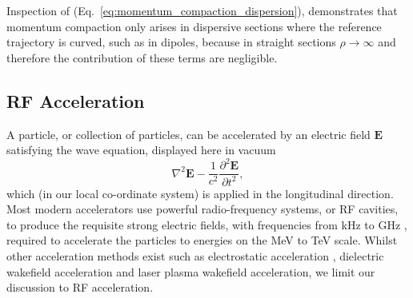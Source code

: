\documentclass[../main.tex]{subfiles}
\begin{document}
Inspection of (Eq.~\ref{eq:momentum_compaction_dispersion}), demonstrates that momentum compaction only arises in dispersive sections where the reference trajectory is curved, such as in dipoles, because in straight sections $\rho\rightarrow\infty$ and therefore the contribution of these terms are negligible. 

\subsection{RF Acceleration}

A particle, or collection of particles, can be accelerated by an electric field $\boldsymbol{E}$ satisfying the wave equation, displayed here in vacuum
\begin{equation}
\nabla^{2}\boldsymbol{E}-\frac{1}{c^{2}}\frac{\partial^{2}\boldsymbol{E}}{\partial t^{2}},
\label{eq:electromagnetic_wave_equation}    
\end{equation}
which (in our local co-ordinate system) is applied in the longitudinal direction. Most modern accelerators use powerful radio-frequency systems, or RF cavities, to produce the requisite strong electric fields, with frequencies from \si{\kilo\hertz} to \si{\giga\hertz} \cite{wille2000physics}, required to accelerate the particles to energies on the \si{\mega\electronvolt} to \si{\tera\electronvolt} scale. Whilst other acceleration methods exist such as electrostatic acceleration \cite{}, dielectric wakefield acceleration \cite{} and laser plasma wakefield acceleration, we limit our discussion to RF acceleration.
\end{document}
